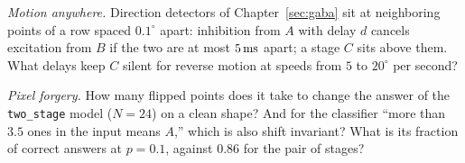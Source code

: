 \begin{exercise}[\lvlB]
\label{ex:12:7}
\emph{Motion anywhere.} Direction detectors of Chapter~\ref{sec:gaba} sit at neighboring points of a row spaced $0.1^\circ$ apart: inhibition from $A$ with delay $d$ cancels excitation from $B$ if the two are at most $5\,\text{ms}$ apart; a stage $C$ sits above them. What delays keep $C$ silent for reverse motion at speeds from $5$ to $20^\circ$ per second?
\end{exercise}

\begin{exercise}[\lvlC]
\label{ex:12:8}
\emph{Pixel forgery.} How many flipped points does it take to change the answer of the \texttt{two\_stage} model ($N=24$) on a clean shape? And for the classifier ``more than $3.5$ ones in the input means $A$,'' which is also shift invariant? What is its fraction of correct answers at $p=0.1$, against $0.86$ for the pair of stages?
\end{exercise}
